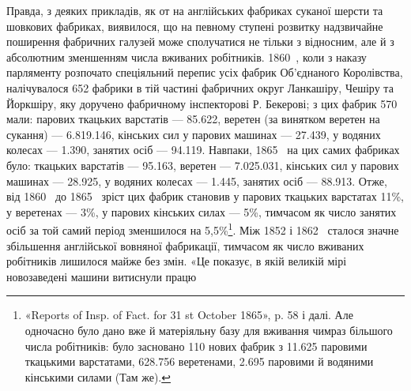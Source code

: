 Правда, з деяких прикладів, як от на англійських фабриках
суканої шерсти та шовкових фабриках, виявилося, що на певному
ступені розвитку надзвичайне поширення фабричних галузей
може сполучатися не тільки з відносним, але й з абсолютним
зменшенням числа вживаних робітників. 1860~, коли з наказу
парляменту розпочато спеціяльний перепис усіх фабрик Об’єднаного
Королівства, налічувалося 652 фабрики в тій частині
фабричних округ Ланкашіру, Чешіру та Йоркшіру, яку доручено
фабричному інспекторові Р. Бекерові; з цих фабрик 570 мали:
парових ткацьких варстатів — \num{85.622}, веретен (за винятком веретен
на сукання) — \num{6.819.146}, кінських сил у парових машинах —
\num{27.439}, у водяних колесах — \num{1.390}, занятих осіб — \num{94.119}.
Навпаки, 1865~ на цих самих фабриках було: ткацьких варстатів
— \num{95.163}, веретен — \num{7.025.031}, кінських сил у парових машинах
— \num{28.925}, у водяних колесах — \num{1.445}, занятих осіб —
\num{88.913}. Отже, від 1860~ до 1865~ зріст цих фабрик становив
у парових ткацьких варстатах 11\%, у веретенах — 3\%, у парових
кінських силах — 5\%, тимчасом як число занятих осіб за той
самий період зменшилося на 5,5\%\footnote{
«Reports of Insp. of Fact. for 31 st October 1865», p. 58 і далі.
Але одночасно було дано вже й матеріяльну базу для вживання чимраз
більшого числа робітників: було засновано 110 нових фабрик з \num{11.625} паровими
ткацькими варстатами, \num{628.756} веретенами, \num{2.695} паровими й водяними
кінськими силами (Там же).
}. Між 1852 і 1862~ сталося
значне збільшення англійської вовняної фабрикації, тимчасом як
число вживаних робітників лишилося майже без змін. «Це показує,
в якій великій мірі новозаведені машини витиснули працю
\parbreak{}  %
